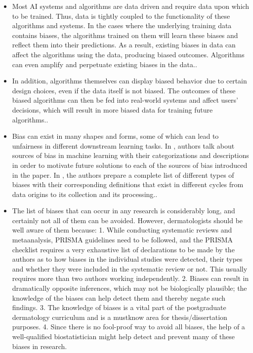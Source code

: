 \documentclass[12pt, a4paper, oneside]{book}   	%
\newif\ifrawcitationactive
\newcommand{\rawcitationend}{
	\color{black}\rawcitationactivefalse
}
\begin{document}
			\begin{itemize}
				\item Most \gls{AI} systems and algorithms are data driven and require data upon which to be trained. Thus, data is tightly coupled to the functionality of these algorithms and systems. In the cases where the underlying training data contains biases, the algorithms trained on them will learn these biases and reflect them into their predictions. As a result, existing biases in data can affect the algorithms using the data, producing biased outcomes. Algorithms can even amplify and perpetuate existing biases in the data.\autocite{Mehrabi_2021}.
				\item In addition, algorithms themselves can display biased behavior due to certain design choices, even if the data itself is not biased. The outcomes of these biased algorithms can then be fed into real-world systems and affect users’ decisions, which will result in more biased data for training future algorithms.\autocite{Mehrabi_2021}.
				
				\item Bias can exist in many shapes and forms, some of which can lead to unfairness in different downstream learning tasks. In \autocite{M144_Suresh_2021}, authors talk about sources of bias in machine learning with their categorizations and descriptions in order to motivate future solutions to each of the sources of bias introduced in the paper. In \autocite{M120_Olteanu_2019}, the authors prepare a complete list of different types of biases with their corresponding definitions that exist in different cycles from data origins to its collection and its processing.\autocite{Mehrabi_2021}.
			\end{itemize}	
			
			\begin{itemize}
				\item The list of biases that can occur in any research is considerably long, and certainly not all of them can be avoided. However, dermatologists should be well aware of them because: 1. While conducting systematic reviews and metaanalysis, PRISMA guidelines need to be followed, and the PRISMA checklist requires a very exhaustive list of declarations to be made by the authors as to how biases in the individual studies were detected, their types and whether they were included in the systematic review or not. This usually requires more than two authors working independently. 2. Biases can result in dramatically opposite inferences, which may not be biologically plausible; the knowledge of the biases can help detect them and thereby negate such findings. 3. The knowledge of biases is a vital part of the postgraduate dermatology curriculum and is a mustknow area for thesis/dissertation purposes. 4. Since there is no fool-proof way to avoid all biases, the help of a well-qualified biostatistician might help detect and prevent many of these biases in research. \autocite{Chakraborty_2024}
			\end{itemize}
			\rawcitationend
			
\end{document}
